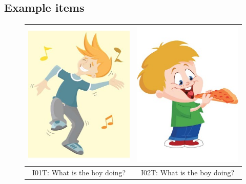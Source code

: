 \documentclass[12pt]{article}
\begin{document}
\clearpage



\subsection{Example items}

\begin{figure}[h]
\begin{center}
\begin{tabular}{|c|c|}
\hline
\includegraphics[width=0.35\columnwidth,trim=0 0 0 -3]{figures/I01.jpg} & \includegraphics[width=0.35\columnwidth,trim=0 0 0 -3]{figures/I02.jpg}\\
\hline
I01T: What is the boy doing? & I02T: What is the boy doing? \\
\hline
\hline

\end{tabular}
\end{center}
\end{figure}
\end{document}
